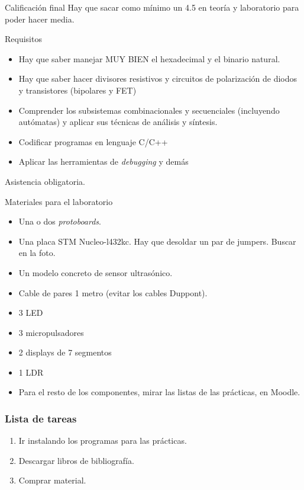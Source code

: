 \documentclass[a4paper]{book}
\begin{document}
Calificación final
Hay que sacar como mínimo un 4.5 en teoría y laboratorio para poder hacer media.

Requisitos

\begin{itemize}
	 \item Hay que saber manejar MUY BIEN el hexadecimal y el binario natural.
	 \item Hay que saber hacer divisores resistivos y circuitos de polarización de diodos y transistores (bipolares y FET)
	 \item Comprender los subsistemas combinacionales y secuenciales (incluyendo autómatas) y aplicar sus técnicas de análisis y síntesis.
	 \item Codificar programas en lenguaje C/C++
	 \item Aplicar las herramientas de \textit{debugging} y demás
\end{itemize}

Asistencia obligatoria.

Materiales para el laboratorio
\begin{itemize}
	 \item Una o dos \textit{protoboards}.
	 \item Una placa STM Nucleo-l432kc. Hay que desoldar un par de jumpers. Buscar en la foto.
	 \item Un modelo concreto de sensor ultrasónico.
	 \item Cable de pares 1 metro (evitar los cables Duppont).
	 \item 3 LED
	 \item 3 micropulsadores
	 \item 2 displays de 7 segmentos
	 \item 1 LDR
	 \item Para el resto de los componentes, mirar las listas de las prácticas, en Moodle.
\end{itemize}

\subsubsection{Lista de tareas} \vspace{\parskip}
\begin{enumerate}
	 \item Ir instalando los programas para las prácticas.
	 \item Descargar libros de bibliografía.
	 \item Comprar material.
\end{enumerate}
\newpage
\end{document}
